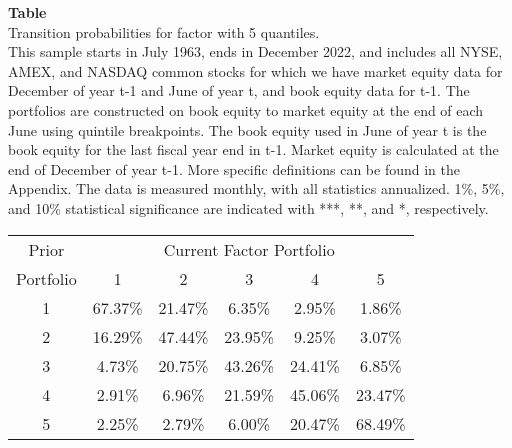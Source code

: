 \begin{table*}[ht!]
\raggedright
{}
\label{tab: transition_probs_BE_MEindustry_adjusted_with_5_quantiles}
\textbf{Table \thetable} \\
Transition probabilities for factor with 5 quantiles. \\
\hspace*{1em}This sample starts in July 1963, ends in December 2022, and includes all NYSE, AMEX, and NASDAQ common stocks for which we have market equity data for December of year t-1 and June of year t, and book equity data for t-1. The portfolios are constructed on book equity to market equity at the end of each June using quintile breakpoints.  The book equity used in June of year t is the book equity for the last fiscal year end in t-1.  Market equity is calculated at the end of December of year t-1.  More specific definitions can be found in the Appendix.  The data is measured monthly, with all statistics annualized.  1\%, 5\%, and 10\% statistical significance are indicated with ***, **, and *, respectively. \\
\vspace{0.5em}
\centering
\begin{adjustbox}{max width=\textwidth}
\begin{tabular}{@{}cccccc@{}}
\toprule
Prior & \multicolumn{5}{c}{Current Factor Portfolio} \\
Portfolio & 1 & 2 & 3 & 4 & 5 \\
\midrule
1 & 67.37\% & 21.47\% & 6.35\% & 2.95\% & 1.86\% \\
2 & 16.29\% & 47.44\% & 23.95\% & 9.25\% & 3.07\% \\
3 & 4.73\% & 20.75\% & 43.26\% & 24.41\% & 6.85\% \\
4 & 2.91\% & 6.96\% & 21.59\% & 45.06\% & 23.47\% \\
5 & 2.25\% & 2.79\% & 6.00\% & 20.47\% & 68.49\% \\
\bottomrule
\end{tabular}
\end{adjustbox}
\end{table*}